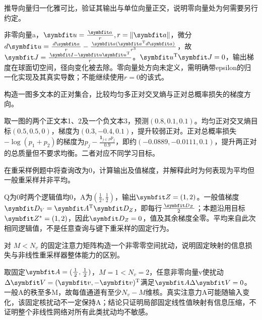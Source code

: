 \begin{exercises}
\begin{exercise} 推导向量归一化雅可比，验证其输出与单位向量正交，说明零向量处为何需要另行约定。

\begin{solution}
非零向量a，$\vect{u}=\frac{\vect{a}}{r},r=\|\vect{a}\|$，微分$d\vect{u}=\frac{d\vect{a}}{r}-\frac{\vect{a}(\vect{a}^{\mathrm{T}}d\vect{a})}{r^3}$，故$\mat{J}=\frac{\mat{I}-\vect{u}\vect{u}^{\mathrm{T}}}{r}$。$\vect{u}^{\mathrm{T}}\mat{J}=0$，输出梯度在球面切空间，径向变化被去除。零向量处方向未定义，需明确带epsilon的归一化实现及其真实导数；不能继续使用$r=0$的该式。
\end{solution}
\end{exercise}

\begin{exercise}\optional 构造一图多文本的正对集合，比较均匀多正对交叉熵与正对总概率损失的梯度方向。

\begin{solution}
取一图的两个正文本1、2及一个负文本3，预测$(0.8,0.1,0.1)$。均匀正对交叉熵目标$(0.5,0.5,0)$，梯度为$(0.3,-0.4,0.1)$，提升较弱正对。正对总概率损失$-\log(p_1+p_2)$的梯度为$p_j-\frac{\mathbf1_{j\in P}p_j}{0.9}$，即约$(-0.0889,-0.0111,0.1)$，提升两正对的总质量但不要求均衡。二者对应不同学习目标。
\end{solution}
\end{exercise}

\begin{exercise} 在重采样例题中将查询改为0，计算输出及值梯度，并解释此时为何表现为平均但一般重采样并非平均。

\begin{solution}
Q为0时两个逻辑值均0，A为$(\frac{1}{2},\frac{1}{2})$，输出$\mat{Z}=(1,2)$。一般值梯度$\mat{D}_V=\mat{A}^{\mathrm{T}}\mat{D}_Z$，即每行$\frac{\mat{D}_Z}{2}$；本题沿用目标$\mat{Z}^*=(1,2)$，因此$\mat{D}_Z=0$，值及其余梯度全零。平均来自此次相同逻辑值，不是任意查询与键下重采样的固定行为。
\end{solution}
\end{exercise}

\begin{exercise}\optional 对 $M<N_v$ 的固定注意力矩阵构造一个非零零空间扰动，说明固定映射的信息损失与非线性重采样器整体能力的区别。

\begin{solution}
取固定$\mat{A}=(\frac{1}{2},\frac{1}{2})$，$M=1<N_v=2$，任意非零向量v使扰动$\Delta \mat{V}=(\vect{v},-\vect{v})^{\mathrm{T}}$满足$\mat{A}\Delta \mat{V}=0$。一般A的秩至多M，故每值通道有至少$N_v-M$维核。真实注意力A可能随输入变化，该固定核扰动不一定保持A；结论只证明局部固定线性值映射有信息压缩，不证明整个非线性网络对所有此类扰动均不敏感。
\end{solution}
\end{exercise}


\end{exercises}
